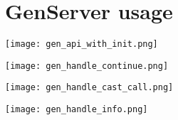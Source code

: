 \section{GenServer usage}
\frame{\tableofcontents[currentsection]}

\begin{frame}
    \texttt{[image: gen\_api\_with\_init.png]}
\end{frame}

\begin{frame}
    \texttt{[image: gen\_handle\_continue.png]}
\end{frame}

\begin{frame}
    \texttt{[image: gen\_handle\_cast\_call.png]}
\end{frame}

\begin{frame}
    \texttt{[image: gen\_handle\_info.png]}
\end{frame}
